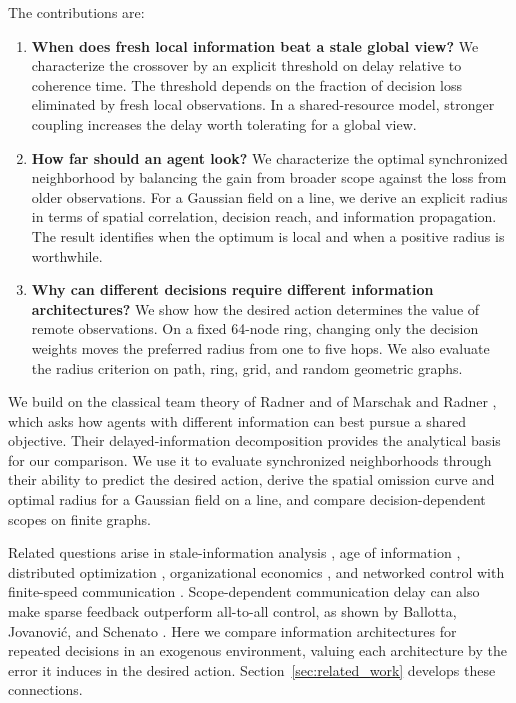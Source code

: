\documentclass[11pt]{article}
\begin{document}
The contributions are:
\begin{enumerate}
\item \textbf{When does fresh local information beat a stale global view?}
We characterize the crossover by an explicit threshold on delay relative
to coherence time. The threshold depends on the fraction of decision loss
eliminated by fresh local observations. In a shared-resource model,
stronger coupling increases the delay worth tolerating for a global view.

\item \textbf{How far should an agent look?}
We characterize the optimal synchronized neighborhood by balancing the
gain from broader scope against the loss from older observations. For a
Gaussian field on a line, we derive an explicit radius in terms of
spatial correlation, decision reach, and information propagation. The
result identifies when the optimum is local and when a positive radius
is worthwhile.

\item \textbf{Why can different decisions require different information architectures?}
We show how the desired action determines the value of remote observations.
On a fixed 64-node ring, changing only the decision weights moves the
preferred radius from one to five hops. We also evaluate the radius
criterion on path, ring, grid, and random geometric graphs.
\end{enumerate}

We build on the classical team theory of Radner and of Marschak and
Radner \cite{radner1962team,marschak1972economic}, which asks how agents
with different information can best pursue a shared objective. Their
delayed-information decomposition provides the analytical basis for our
comparison. We use it to evaluate synchronized neighborhoods through
their ability to predict the desired action, derive the spatial omission
curve and optimal radius for a Gaussian field on a line, and compare
decision-dependent scopes on finite graphs.

Related questions arise in stale-information analysis
\cite{mitzenmacher2000old}, age of information \cite{kaul2012realtime},
distributed optimization \cite{nedic2009distributed}, organizational
economics \cite{alonso2008coordination}, and networked control with
finite-speed communication
\cite{bamieh2002spatial,voulgaris2003optimal,bamieh2005convex,fardad2011finite}.
Scope-dependent communication delay can also make sparse feedback
outperform all-to-all control, as shown by Ballotta, Jovanovi\'c, and
Schenato \cite{ballotta2023latency}. Here we compare information
architectures for repeated decisions in an exogenous environment,
valuing each architecture by the error it induces in the desired action.
Section~\ref{sec:related_work} develops these connections.
\end{document}
